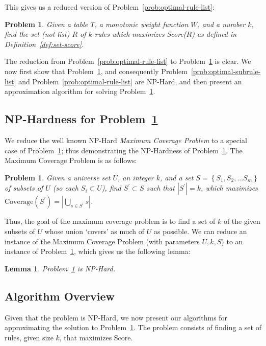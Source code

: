 \documentclass[10pt,journal,compsoc]{IEEEtran}
\newtheorem{lemma}{Lemma}
\newcounter{prob}
\newtheorem{problem}[prob]{Problem}
\begin{document}
This gives us a reduced version of Problem~\ref{prob:optimal-rule-list}: 
\begin{problem}\label{prob:optimal-rule-set}
Given a table $T$, a monotonic weight function $W$, and a number $k$, find the set (not list) $R$ of $k$ rules which maximizes Score($R$) as defined in Definition~\ref{def:set-score}.
\end{problem}

\noindent The reduction from Problem~\ref{prob:optimal-rule-list} to Problem~\ref{prob:optimal-rule-set} is clear. We now first show that Problem~\ref{prob:optimal-rule-set}, and consequently Problem~\ref{prob:optimal-subrule-list} and Problem~\ref{prob:optimal-rule-list} are {\sc NP-Hard}, and then present an approximation algorithm for solving Problem~\ref{prob:optimal-rule-set}.

\subsection{NP-Hardness for Problem~\ref{prob:optimal-rule-set}}
We reduce the well known {\sc NP-Hard} {\em Maximum Coverage Problem} to a special case of Problem~\ref{prob:optimal-rule-set};
thus demonstrating the {\sc NP-Hard}ness of Problem~\ref{prob:optimal-rule-set}. The Maximum Coverage Problem is as follows: 
\begin{problem}\label{prob:maximum-coverage}
Given a universe set $U$, an integer $k$, and a set $S = \left\lbrace S_1, S_2, ... S_m \right\rbrace$ of subsets of $U$ (so each $S_i \subset U$), find $S^{\prime} \subset S$ such that $|S^{\prime}| = k$, which maximizes $\text{Coverage}(S^{\prime}) = |\bigcup_{s \in S^{\prime}} s|$.
\end{problem}
Thus, the goal of the maximum coverage problem is to find a set of $k$ of the given subsets of $U$ whose union `covers' as much of $U$ as possible. We can reduce an instance of the Maximum Coverage Problem (with parameters $U, k, S$) to an instance of Problem~\ref{prob:optimal-rule-set}, which gives us the following lemma:
\begin{lemma}
Problem~\ref{prob:optimal-rule-set} is {\sc NP-Hard}.
\end{lemma}


\subsection{Algorithm Overview}\label{sec:alg-overview}
Given that the problem is {\sc NP-Hard}, we now present our algorithms 
for approximating the solution to Problem~\ref{prob:optimal-rule-set}. 
The problem consists of finding a set of rules, given size $k$, that maximizes 
Score. 
\end{document}
